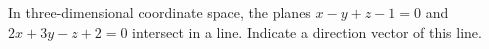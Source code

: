 In three-dimensional coordinate space, the planes $x-y+z-1=0$ and $2x+3y-z+2=0$ intersect in a line. Indicate a direction vector of this line.
